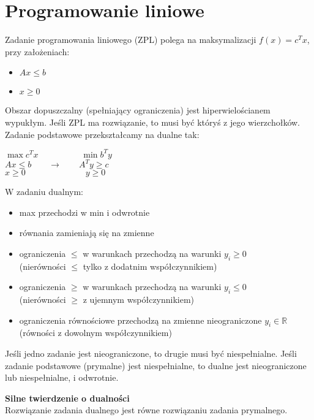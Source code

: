 \section{Programowanie liniowe}
Zadanie programowania liniowego (ZPL) polega na maksymalizacji \( f(x) = c^Tx \), przy założeniach:
\begin{itemize}
\onehalfspacing
    \item \( Ax \leq b \)
    \item \( x \geq 0 \)
\end{itemize}
Obszar dopuszczalny (spełniający ograniczenia) jest hiperwielościanem wypukłym. Jeśli ZPL ma rozwiązanie, to musi być któryś z jego wierzchołków. \\
Zadanie podstawowe przekształcamy na dualne tak:
\begin{center}
    \( \max c^Tx \quad\quad\quad\quad\quad \min b^Ty \) \\
    \( Ax \leq b \quad\quad\rightarrow\quad\quad A^Ty \geq c \) \\
    \( x \geq 0 \quad\quad\quad\quad\quad\quad\quad y \geq 0 \)
\end{center}

W zadaniu dualnym:
\begin{itemize}
\onehalfspacing
    \item max przechodzi w min i odwrotnie
    \item równania zamieniają się na zmienne
    \item ograniczenia \( \leq \) w warunkach przechodzą na warunki \( y_i \geq 0 \) \\
    (nierówności \( \leq \) tylko z dodatnim współczynnikiem)
    \item ograniczenia \( \geq \) w warunkach przechodzą na warunki \( y_i \leq 0 \) \\
    (nierówności \( \geq \) z ujemnym współczynnikiem)
    \item ograniczenia równościowe przechodzą na zmienne nieograniczone \( y_i \in \mathbb{R} \) \\
    (równości z dowolnym współczynnikiem)
\end{itemize}
Jeśli jedno zadanie jest nieograniczone, to drugie musi być niespełnialne.
Jeśli zadanie podstawowe (prymalne) jest niespełnialne, to dualne jest nieograniczone lub niespełnialne, i odwrotnie.

\noindent
\textbf{Silne twierdzenie o dualności} \\
Rozwiązanie zadania dualnego jest równe rozwiązaniu zadania prymalnego.